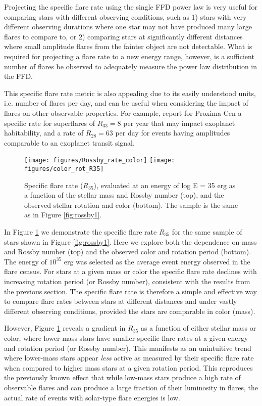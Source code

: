 \documentclass[preprint2]{aastex62}
\begin{document}
Projecting the specific flare rate using the single FFD power law is very useful for comparing stars with different observing conditions, such as 1) stars with very different observing durations where one star may not have produced many large flares to compare to, or 2) comparing stars at significantly different distances where small amplitude flares from the fainter object are not detectable. What is required for projecting a flare rate to a new energy range, however, is a sufficient number of flares be observed to adequately measure the power law distribution in the FFD.

This specific flare rate metric is also appealing due to its easily understood units, i.e. number of flares per day, and can be useful when considering the impact of flares on other observable properties. For example, \citet{davenport2016b} report for Proxima Cen a specific rate for superflares of $R_{33}=8$ per year that may impact exoplanet habitability, and a rate of $R_{28}=63$ per day for events having amplitudes comparable to an exoplanet transit signal.



\begin{figure}[!t]
\centering
\texttt{[image: figures/Rossby\_rate\_color]}
\texttt{[image: figures/color\_rot\_R35]}
\caption{
Specific flare rate ($R_{35}$), evaluated at an energy of log E = 35 erg as a function of the stellar mass and Rossby number (top), and the observed stellar rotation and color (bottom). The sample is the same as in Figure \ref{fig:rossby1}.
}
\label{fig:rossby2}
\end{figure}


In Figure \ref{fig:rossby2} we demonstrate the specific flare rate $R_{35}$ for the same sample of stars shown in Figure \ref{fig:rossby1}. Here we explore both the dependence on mass and Rossby number (top) and the observed color and rotation period (bottom). The energy of $10^{35}$ erg was selected as the average event energy observed in the \citet{davenport2016} flare census. For stars at a given mass or color the specific flare rate declines with increasing rotation period (or Rossby number), consistent with the results from the previous section. The specific flare rate is therefore a simple and effective way to compare flare rates between stars at different distances and under vastly different observing conditions, provided the stars are comparable in color (mass).


However, Figure \ref{fig:rossby2} reveals a gradient in $R_{35}$ as a function of either stellar mass or color, where lower mass stars have smaller specific flare rates at a given energy and rotation period (or Rossby number).
This manifests as an unintuitive trend where lower-mass stars appear {\it less} active as measured by their specific flare rate when compared to higher mass stars at a given rotation period.
This reproduces the previously known effect that while low-mass stars produce a high rate of observable flares and can produce a large fraction of their luminosity in flares, the actual rate of events with solar-type flare energies is low. 
\end{document}
